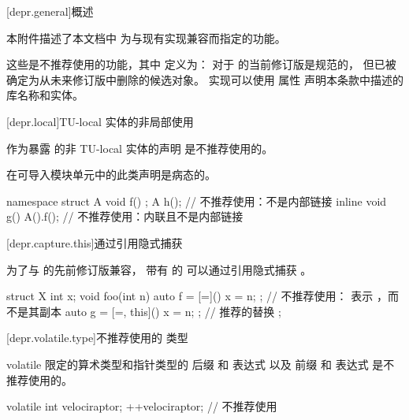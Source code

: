 
[depr.general]{概述}

\pnum
本附件描述了本文档中
为与现有实现兼容而指定的功能。

\pnum
这些是不推荐使用的功能，其中
定义为：
对于 \Cpp{} 的当前修订版是规范的，
但已被确定为从未来修订版中删除的候选对象。
实现可以使用
 属性 声明本条款中描述的库名称和实体。

[depr.local]{TU-local 实体的非局部使用}

\pnum
作为暴露 的非 TU-local 实体的声明
是不推荐使用的。
\begin{note}
在可导入模块单元中的此类声明是病态的。
\end{note}
\begin{example}
\begin{codeblock}
namespace {
  struct A {
    void f() {}
  };
}
A h();                          // 不推荐使用：不是内部链接
inline void g() {A().f();}      // 不推荐使用：内联且不是内部链接
\end{codeblock}
\end{example}

[depr.capture.this]{通过引用隐式捕获 }

\pnum
为了与 \Cpp{} 的先前修订版兼容，
带有 
\tcode{=} 的  可以通过引用隐式捕获
。
\begin{example}
\begin{codeblock}
struct X {
  int x;
  void foo(int n) {
    auto f = [=]() { x = n; };          // 不推荐使用： 表示 ，而不是其副本
    auto g = [=, this]() { x = n; };    // 推荐的替换
  }
};
\end{codeblock}
\end{example}

[depr.volatile.type]{不推荐使用的  类型}

\pnum
volatile 限定的算术类型和指针类型的
后缀 \tcode{++} 和 \tcode{--} 表达式 以及
前缀 \tcode{++} 和 \tcode{--} 表达式
是不推荐使用的。

\begin{example}
\begin{codeblock}
volatile int velociraptor;
++velociraptor;                     // 不推荐使用
\end{codeblock}
\end{example}


